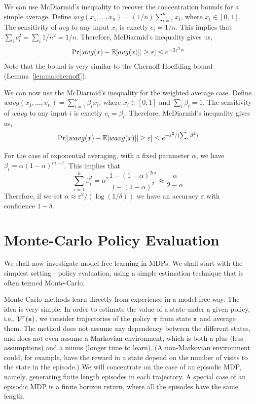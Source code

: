 {We can use McDiarmid's inequality to recover the concentration bounds
for a simple average. Define $avg(x_1, \ldots ,
x_n)=(1/n)\sum_{i=1}^n x_i$, where $x_i\in[0,1]$. The sensitivity of
$avg$ to any input $x_i$ is exactly $c_i=1/n$. This implies that
$\sum_i c_i^2=\sum_i 1/n^2=1/n$. Therefore, McDiarmid's inequality
gives us,
\[
\Pr[|avg(x)-\mathbb{E}[avg(x)]|\geq \varepsilon]\leq e^{-2\varepsilon^2n}
\]
Note that the bound is very similar to the Chernoff-Hoeffding bound
(Lemma~\ref{lemma:chernoff}).

We can now use the McDiarmid's inequality for the weighted average
case. Define $wavg(x_1, \ldots , x_n)=\sum_{i=1}^n \beta_i x_i$,
where $x_i\in[0,1]$ and $\sum_i \beta_i=1$. The sensitivity of
$wavg$ to any input $i$ is exactly $c_i=\beta_i$.
Therefore, McDiarmid's inequality gives us,
\[
\Pr[|wavg(x)-\mathbb{E}[wavg(x)]|\geq \varepsilon]\leq
e^{-\varepsilon^2/(\sum_i \beta_i^2)}
\]

For the case of exponential averaging, with a fixed parameter $\alpha$, we have $\beta_i=\alpha(1-\alpha)^{m-i}$. This implies
that
\[
\sum_{i=1}^n \beta_i^2 =
\alpha^2\frac{1-(1-\alpha)^{2m}}{1-(1-\alpha)^2}\approx
\frac{\alpha}{2-\alpha}
\]
Therefore, if we set $\alpha\approx \varepsilon^2/(\log (1/\delta))$
we have an accuracy $\varepsilon$ with confidence $1-\delta$.
}


\section{Monte-Carlo Policy Evaluation}
\label{sec:MC}
We shall now investigate model-free learning in MDPs. We shall start with the simplest setting - policy evaluation, using a simple estimation technique that is often termed Monte-Carlo. 


Monte-Carlo methods learn directly from experience in a model free
way. The idea is very simple. In order to estimate the value of a
state under a given policy, i.e., $\mathcal{V}^\pi({\tt s})$, we
consider trajectories of the policy $\pi$ from state ${\tt s}$
and average them. The method does not assume any dependency between
the different states, and does not even assume a Markovian
environment, which is both a plus (less assumptions) and a minus
(longer time to learn). (A non-Markovian environment could, for
example, have the reward in a state depend on the number of visits
to the state in the episode.) We will concentrate on the case of an
episodic MDP, namely, generating finite length episodes in each
trajectory. A special case of an episodic MDP is a finite horizon
return, where all the episodes have the same length.

